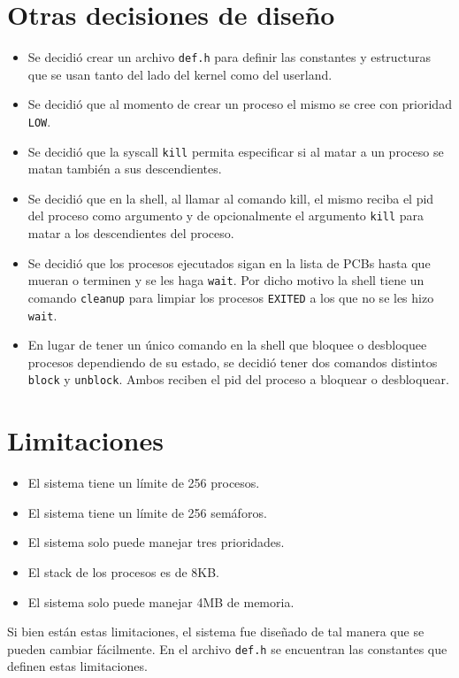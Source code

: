 \documentclass{article}
\begin{document}
\section {Otras decisiones de diseño}
\begin{itemize}
    \item Se decidió crear un archivo \texttt{\texttt{def.h}} para definir las constantes y estructuras que se usan tanto del lado del kernel como del userland.
    \item Se decidió que al momento de crear un proceso el mismo se cree con prioridad \texttt{LOW}.
    \item Se decidió que la syscall \texttt{kill} permita especificar si al matar a un proceso se matan también a sus descendientes.
    \item Se decidió que en la shell, al llamar al comando kill, el mismo reciba el pid del proceso como argumento y de opcionalmente el argumento \texttt{kill} para matar a los descendientes del proceso.
    \item Se decidió que los procesos ejecutados sigan en la lista de PCBs hasta que mueran o terminen y se les haga \texttt{wait}. Por dicho motivo la shell tiene un comando \texttt{cleanup} para limpiar los procesos \texttt{EXITED} a los que no se les hizo \texttt{wait}.\item En lugar de tener un único comando en la shell que bloquee o desbloquee procesos dependiendo de su estado, se decidió tener dos comandos distintos \texttt{block} y \texttt{unblock}. Ambos reciben el pid del proceso a bloquear o desbloquear.
\end{itemize}

\section {Limitaciones}
\begin{itemize}
    \item El sistema tiene un límite de 256 procesos.
    \item El sistema tiene un límite de 256 semáforos.
    \item El sistema solo puede manejar tres prioridades.
    \item El stack de los procesos es de 8KB.
    \item El sistema solo puede manejar 4MB de memoria.
\end{itemize}

Si bien están estas limitaciones, el sistema fue diseñado de tal manera que se pueden cambiar fácilmente.
En el archivo \texttt{def.h} se encuentran las constantes que definen estas limitaciones.
\end{document}
